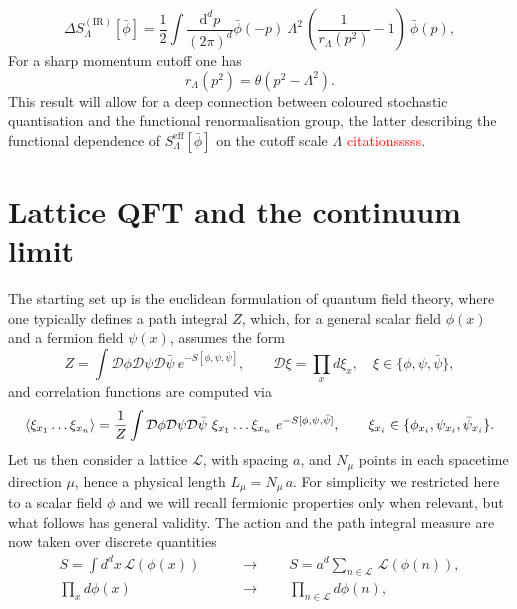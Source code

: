 \begin{equation} 
    \Delta S_{\Lambda}^{(\mathrm{IR})}[\bar\phi] = \frac{1}{2} \int \frac{\mathrm{d}^d p}{(2 \pi)^d} \bar\phi(-p) \ \Lambda^2 \, \left(\frac{1}{r_{\Lambda}(p^2)}-1\right) \ \bar\phi(p),
\end{equation}
For a sharp momentum cutoff one has
\begin{equation*}
    r_{\Lambda}(p^2) = \theta\left(p^2-\Lambda^2\right).
\end{equation*}
This result will allow for a deep connection between coloured stochastic quantisation and the functional renormalisation group, the latter describing the functional dependence of $S_\Lambda^\text{eff}[\bar\phi]$ on the cutoff scale $\Lambda$ \textcolor{red}{citationsssss}.


\section{Lattice QFT and the continuum limit}
\label{sec:lattice_continuum_}
The starting set up is the euclidean formulation of quantum field theory, where one typically defines a path integral $Z$, which, for a general scalar field $\phi(x)$ and a fermion field $\psi(x)$, assumes the form
\begin{equation}
    Z = \int \mathcal{D}\phi\mathcal{D}\psi\mathcal{D}\bar\psi \ e^{-S[\phi, \psi, \bar\psi]}, \qquad \mathcal{D}\xi = \prod_x d\xi_x, \quad \xi \in \{\phi, \psi, \bar\psi\},
    \label{eq:path_integral_generic}
\end{equation}
and correlation functions are computed via
\begin{equation*}
        \left\langle \xi_{x_1} \dots \xi_{x_n}  \right\rangle = \frac{1}{Z} \int \mathcal{D}\phi\mathcal{D}\psi\mathcal{D}\bar\psi \ \xi_{x_1} \dots \xi_{x_n} \ e^{-S[\phi, \psi, \bar\psi]}, \qquad \xi_{x_i} \in \{\phi_{x_i}, \psi_{x_i}, \bar\psi_{x_i}\}. \\
\end{equation*}
Let us then consider a lattice $\mathscr{L}$, with spacing $a$, and $N_\mu$ points in each spacetime direction $\mu$, hence a physical length $L_\mu = N_\mu \, a$.
For simplicity we restricted here to a scalar field $\phi$ and we will recall fermionic properties only when relevant, but what follows has general validity. 
The action and the path integral measure are now taken over discrete quantities 
\begin{equation*}
    \begin{aligned}
	    S = \int d^dx \, \mathcal{L}(\phi(x)) \qquad &\to \qquad S = a^d \sum_{n \in \mathscr{L}} \, \mathcal{L}(\phi(n)), \\
        \prod_{x} d\phi(x) \qquad &\to  \qquad \prod_{n \in \mathscr{L}} d\phi(n),
    \end{aligned}
\end{equation*}
